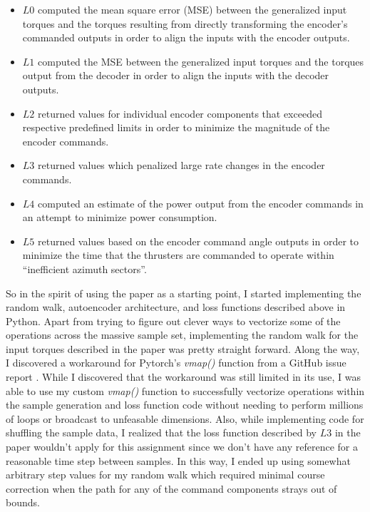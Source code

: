 \documentclass{article}
\begin{document}
\begin{itemize}
    \item $L0$ computed the mean square error (MSE) between the generalized input torques and the torques resulting from directly transforming the encoder's commanded outputs in order to align the inputs with the encoder outputs.
    \item $L1$ computed the MSE between the generalized input torques and the torques output from the decoder in order to align the inputs with the decoder outputs.
    \item $L2$ returned values for individual encoder components that exceeded respective predefined limits in order to minimize the magnitude of the encoder commands.
    \item $L3$ returned values which penalized large rate changes in the encoder commands.
    \item $L4$ computed an estimate of the power output from the encoder commands in an attempt to minimize power consumption.
    \item $L5$ returned values based on the encoder command angle outputs in order to minimize the time that the thrusters are commanded to operate within ``inefficient azimuth sectors''.
\end{itemize}

So in the spirit of using the paper as a starting point, I started implementing the random walk, autoencoder architecture, and loss functions described above in Python. Apart from trying to figure out clever ways to vectorize some of the operations across the massive sample set, implementing the random walk for the input torques described in the paper was pretty straight forward. Along the way, I discovered a workaround for Pytorch's \textit{vmap()} function from a GitHub issue report \cite{github}. While I discovered that the workaround was still limited in its use, I was able to use my custom \textit{vmap()} function to successfully vectorize operations within the sample generation and loss function code without needing to perform millions of loops or broadcast to unfeasable dimensions. Also, while implementing code for shuffling the sample data, I realized that the loss function described by $L3$ in the paper wouldn't apply for this assignment since we don't have any reference for a reasonable time step between samples. In this way, I ended up using somewhat arbitrary step values for my random walk which required minimal course correction when the path for any of the command components strays out of bounds.
\end{document}
